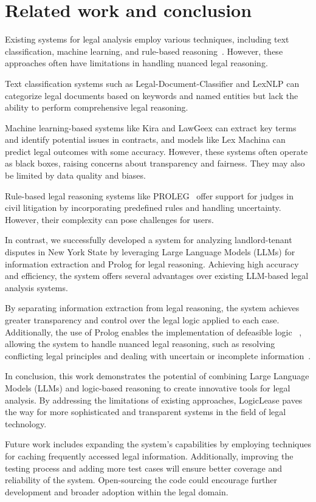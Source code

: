 \section{Related work and conclusion}
\label{sec:related-conclusion}

Existing systems for legal analysis employ various techniques, including text classification, machine learning, and rule-based reasoning~\cite{avram2021pyeurovoc, lexnlp, kira, lawgeex, lexmachina}. However, these approaches often have limitations in handling nuanced legal reasoning. 

Text classification systems such as Legal-Document-Classifier \cite{avram2021pyeurovoc} and LexNLP \cite{lexnlp}  can categorize legal documents based on keywords and named entities but lack the ability to perform comprehensive legal reasoning. 

Machine learning-based systems like Kira \cite{kira} and LawGeex \cite{lawgeex} can extract key terms and identify potential issues in contracts, and models like Lex Machina \cite{lexmachina} can predict legal outcomes with some accuracy. However, these systems often operate as black boxes, raising concerns about transparency and fairness. They may also be limited by data quality and biases.

Rule-based legal reasoning systems like PROLEG~\cite{satoh2010proleg, prolegag} offer support for judges in civil litigation by incorporating predefined rules and handling uncertainty. However, their complexity can pose challenges for users.

In contrast, we successfully developed a system for analyzing landlord-tenant disputes in New York State by leveraging Large Language Models (LLMs) for information extraction and Prolog for legal reasoning. Achieving high accuracy and efficiency, the system offers several advantages over existing LLM-based legal analysis systems.

By separating information extraction from legal reasoning, the system achieves greater transparency and control over the legal logic applied to each case. Additionally, the use of Prolog enables the implementation of defeasible logic ~\cite{wan2009logic,wan2015defeasibility}, allowing the system to handle nuanced legal reasoning, such as resolving conflicting legal principles and dealing with uncertain or incomplete information~\cite{morris24}.


In conclusion, this work demonstrates the potential of combining Large Language Models (LLMs) and logic-based reasoning to create innovative tools for legal analysis. By addressing the limitations of existing approaches, LogicLease paves the way for more sophisticated and transparent systems in the field of legal technology.

Future work includes expanding the system's capabilities by employing techniques for caching frequently accessed legal information. Additionally, improving the testing process and adding more test cases will ensure better coverage and reliability of the system. Open-sourcing the code could encourage further development and broader adoption within the legal domain.

\nocite{*}

